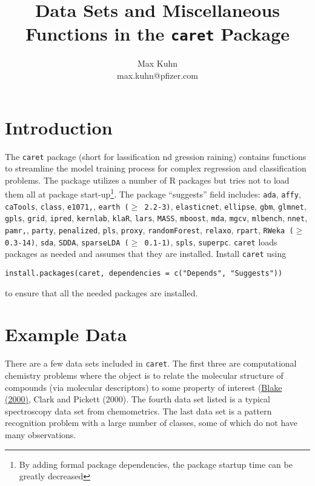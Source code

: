 \documentclass[12pt]{article}
\title{Data Sets and Miscellaneous Functions in the {\tt caret} Package}
\author{Max Kuhn \\ max.kuhn@pfizer.com}
\begin{document}
\maketitle

\thispagestyle{empty}
	
\section{Introduction}


The \texttt{caret} package (short for {\bf{\color{blue}{c}}}lassification {\bf{\color{blue}{a}}}nd {\bf{\color{blue}{re}}}gression {\bf{\color{blue}{t}}}raining) contains functions to streamline the model training process for complex regression and classification problems. The package utilizes a number of R packages but tries not to load them all at package start-up\footnote{By adding formal package dependencies, the package startup time can be greatly decreased}. The package ``suggests'' field includes: \texttt{ada}, \texttt{affy}, \texttt{caTools}, \texttt{class}, \texttt{e1071,}, \texttt{earth ($\ge$ 2.2-3)}, \texttt{elasticnet}, \texttt{ellipse}, \texttt{gbm}, \texttt{glmnet}, \texttt{gpls}, \texttt{grid}, \texttt{ipred}, \texttt{kernlab}, \texttt{klaR}, \texttt{lars}, \texttt{MASS}, \texttt{mboost}, \texttt{mda}, \texttt{mgcv}, \texttt{mlbench}, \texttt{nnet}, \texttt{pamr,}, \texttt{party}, \texttt{penalized}, \texttt{pls}, \texttt{proxy}, \texttt{randomForest}, \texttt{relaxo}, \texttt{rpart}, \texttt{RWeka ($\ge$ 0.3-14)}, \texttt{sda}, \texttt{SDDA}, \texttt{sparseLDA ($\ge$ 0.1-1)}, \texttt{spls}, \texttt{superpc}. \texttt{caret} loads packages as needed and assumes that they are installed. Install \texttt{caret} using 
\begin{Verbatim}
install.packages(caret, dependencies = c("Depends", "Suggests"))
\end{Verbatim}
to ensure that all the needed packages are installed.


\section{Example Data}

There are a few data sets included in \texttt{caret}. The first three are computational chemistry problems where the object is to relate the molecular structure of compounds (via molecular descriptors) to some property of interest (\href{ http://dx.doi.org/10.1016/S1359-6446(99)01451-8}{Blake (2000)}, Clark and Pickett (2000). The fourth data set listed is a typical spectroscopy data set from chemometrics. The last data set is a pattern recognition problem with a large number of classes, some of which do not have many observations.
\end{document}
